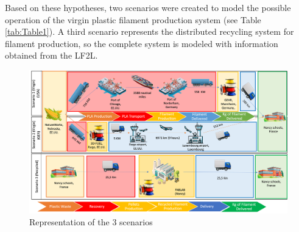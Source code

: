 \documentclass[12pt]{elsarticle} %
\begin{document}
Based on these hypotheses, two scenarios were created to model the possible operation of the virgin plastic filament production system (see Table \ref{tab:Table1}).
A third scenario represents the distributed recycling system for filament production, so the complete system is modeled with information obtained from the LF2L.

\begin{figure}[H]

{\centering \includegraphics[width=0.9\linewidth,]{Figures/Scenarios} 

}

\caption{Representation of the 3 scenarios}\label{fig:figure}
\end{figure}

\begingroup\fontsize{9}{11}\selectfont
\end{document}
